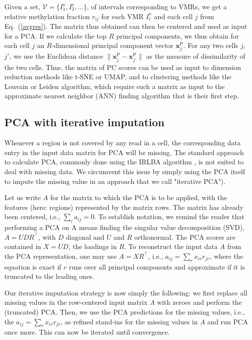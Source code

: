 \documentclass[10pt]{article}
\begin{document}
Given a set, $\mathcal{V}=\{I^\text{v}_1,I^\text{v}_2,\dots\}$, of intervals corresponding to VMRs, we get a relative methylation fraction $r_{ij}$ for each VMR $I^\text{v}_i$ and each cell $j$ from Eq.\ (\ref{avgres}).
The matrix thus obtained can then be centered and used as input for a PCA.
If we calculate the top $R$ principal components, we thus obtain for each cell $j$ an $R$-dimensional principal component vector $\mathbf{x}^\text{P}_j$.
For any two cells $j$, $j'$, we use the Euclidean distance $\|\mathbf{x}^\text{P}_j - \mathbf{x}^\text{P}_{j'}\|$ as the measure of dissimilarity of the two cells.
Thus, the matrix of PC scores can be used as input to dimension reduction methods like t-SNE or UMAP, and to clustering methods like the Louvain or Leiden algorithm, which require such a matrix as input to the approximate nearest neighbor (ANN) finding algorithm that is their first step.

\subsection*{PCA with iterative imputation}

Whenever a region is not covered by any read in a cell, the corresponding data entry in the input data matrix for PCA will be missing.
The standard approach to calculate PCA, commonly done using the IRLBA algorithm \citep{Baglama2005}, is not suited to deal with missing data.
We circumvent this issue by simply using the PCA itself to impute the missing value in an approach that we call "iterative PCA").

Let us write $A$ for the matrix to which the PCA is to be applied, with the features (here: regions) represented by the matrix rows.
The matrix has already been centered, i.e., $\sum_i a_{ij}=0$.
To establish notation, we remind the reader that performing a PCA on A means finding the singular value decomposition (SVD), $A=UDR^\top$, with $D$ diagonal and $U$ and $R$ orthonormal.
The PCA scores are contained in $X=UD$, the loadings in $R$.
To reconstruct the input data $A$ from the PCA representation, one may use $A=XR^\top$, i.e., $a_{ij}=\sum_r x_{ir} r_{jr}$, where the equation is exact if $r$ runs over all principal components and approximate if it is truncated to the leading ones.

Our iterative imputation strategy is now simply the following: we first replace all missing values in the row-centered input matrix $A$ with zeroes and perform the (truncated) PCA.
Then, we use the PCA predictions for the missing values, i.e., the $a_{ij}=\sum_r x_{ir} r_{jr}$, as refined stand-ins for the missing values in $A$ and run PCA once more.
This can now be iterated until convergence.
\end{document}
